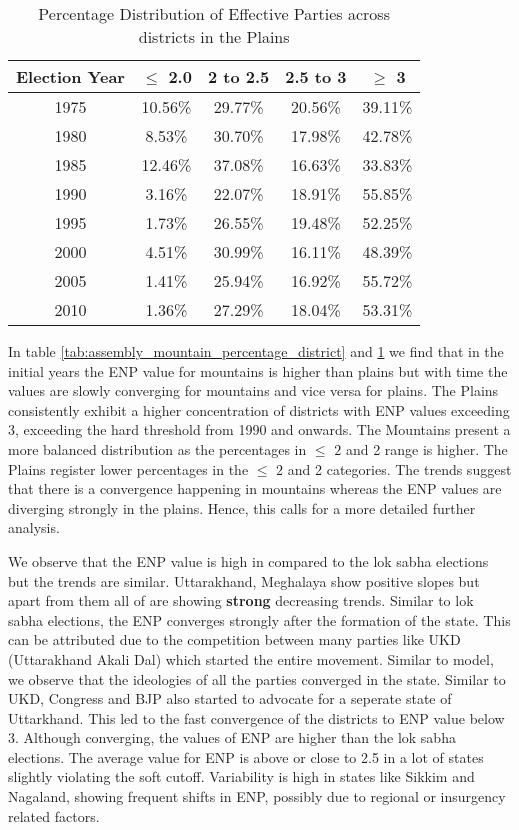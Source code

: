     \begin{table}[h]
        \centering
        \begin{tabular}{|c|c|c|c|c|}
        \hline
        Election Year & $\leq$ 2.0 & 2 to 2.5 & 2.5 to 3 & $\geq$ 3 \\ \hline
        1975 & 10.56\% & 29.77\% & 20.56\% & 39.11\% \\ \hline
        1980 & 8.53\% & 30.70\% & 17.98\% & 42.78\% \\ \hline
        1985 & 12.46\% & 37.08\% & 16.63\% & 33.83\% \\ \hline
        1990 & 3.16\% & 22.07\% & 18.91\% & 55.85\% \\ \hline
        1995 & 1.73\% & 26.55\% & 19.48\% & 52.25\% \\ \hline
        2000 & 4.51\% & 30.99\% & 16.11\% & 48.39\% \\ \hline
        2005 & 1.41\% & 25.94\% & 16.92\% & 55.72\% \\ \hline
        2010 & 1.36\% & 27.29\% & 18.04\% & 53.31\% \\ \hline
        \end{tabular}
        \caption{Percentage Distribution of Effective Parties across districts in the Plains}
        \label{tab:assembly_plains_percentage_district}
        \end{table}
        
In table \ref{tab:assembly_mountain_percentage_district} and \ref{tab:assembly_plains_percentage_district} we find that in the initial years the ENP value for mountains is higher than plains but with time the values are slowly converging for mountains and vice versa for plains. The Plains consistently exhibit a higher concentration of districts with ENP values exceeding $3$, exceeding the hard threshold from 1990 and onwards.  The Mountains present a more balanced distribution as the percentages in $\leq$ $2$ and 2  range is higher.  The Plains  register lower percentages in the $\leq$ $2$ and 2  categories. The trends suggest that there is a convergence happening in mountains whereas the ENP values are diverging strongly in the plains. Hence, this calls for a more detailed further analysis.

 We observe that the ENP value is high in compared to the lok sabha elections but the trends are similar. Uttarakhand, Meghalaya show positive slopes but apart from them all of are showing \textbf{strong} decreasing trends. Similar to lok sabha elections, the ENP converges strongly after the formation of the state. This can be attributed due to the competition between many parties like UKD (Uttarakhand Akali Dal) which started the entire movement. Similar to \cite{fey2007duverger} model, we observe that the ideologies of all the parties converged in the state. Similar to UKD, Congress and BJP also started to advocate for a seperate state of Uttarkhand. This led to the fast convergence of the districts to ENP value below 3. Although converging, the values of ENP are higher than the lok sabha elections. The average value for ENP is above or close to 2.5 in a lot of states slightly violating the soft cutoff. Variability is high in states like Sikkim and Nagaland, showing frequent shifts in ENP, possibly due to regional or insurgency related factors. 
 
